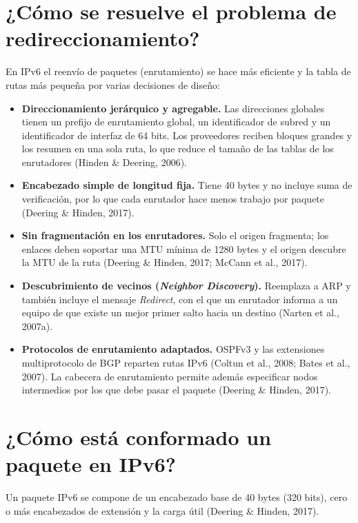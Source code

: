 \documentclass[12pt,letterpaper]{article}
\begin{document}
\section{¿Cómo se resuelve el problema de redireccionamiento?}
En IPv6 el reenvío de paquetes (enrutamiento) se hace más eficiente y la tabla de rutas más pequeña por varias decisiones de diseño:
\begin{itemize}
\item \textbf{Direccionamiento jerárquico y agregable.} Las direcciones globales tienen un prefijo de enrutamiento global, un identificador de subred y un identificador de interfaz de 64 bits. Los proveedores reciben bloques grandes y los resumen en una sola ruta, lo que reduce el tamaño de las tablas de los enrutadores (Hinden \& Deering, 2006).
\item \textbf{Encabezado simple de longitud fija.} Tiene 40 bytes y no incluye suma de verificación, por lo que cada enrutador hace menos trabajo por paquete (Deering \& Hinden, 2017).
\item \textbf{Sin fragmentación en los enrutadores.} Solo el origen fragmenta; los enlaces deben soportar una MTU mínima de 1280 bytes y el origen descubre la MTU de la ruta (Deering \& Hinden, 2017; McCann et al., 2017).
\item \textbf{Descubrimiento de vecinos (\emph{Neighbor Discovery}).} Reemplaza a ARP y también incluye el mensaje \emph{Redirect}, con el que un enrutador informa a un equipo de que existe un mejor primer salto hacia un destino (Narten et al., 2007a).
\item \textbf{Protocolos de enrutamiento adaptados.} OSPFv3 y las extensiones multiprotocolo de BGP reparten rutas IPv6 (Coltun et al., 2008; Bates et al., 2007). La cabecera de enrutamiento permite además especificar nodos intermedios por los que debe pasar el paquete (Deering \& Hinden, 2017).
\end{itemize}

\section{¿Cómo está conformado un paquete en IPv6?}
Un paquete IPv6 se compone de un encabezado base de 40 bytes (320 bits), cero o más encabezados de extensión y la carga útil (Deering \& Hinden, 2017).
\end{document}
